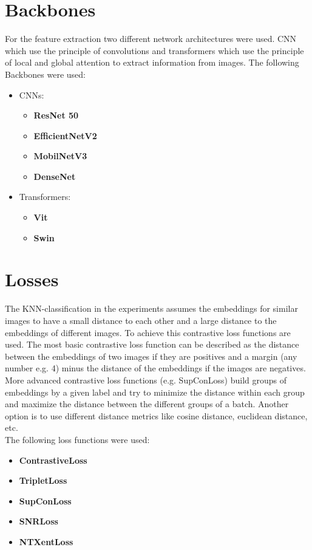 \documentclass[12pt,a4paper]{report}
\begin{document}
\section{Backbones}
For the feature extraction two different network architectures were used.
CNN which use the principle of convolutions and transformers which use the principle of local and global attention to extract information from images. 
The following Backbones were used:
\begin{itemize}
	\item CNNs:\begin{itemize}
		\item \textbf{ResNet 50} \cite{resnet}
		\item \textbf{EfficientNetV2} \cite{EfficientNetV2}
		\item \textbf{MobilNetV3} \cite{MobilNetV3}
		\item \textbf{DenseNet} \cite{DenseNet}
	\end{itemize}
	\item Transformers:\begin{itemize}
		\item \textbf{Vit} \cite{ViT}
		\item \textbf{Swin} \cite{liu2021swin}
    \end{itemize}
\end{itemize}

\section{Losses}
The KNN-classification in the experiments assumes the embeddings for similar images to have a small distance to each other
and a large distance to the embeddings of different images.
To achieve this contrastive loss functions are used.
The most basic contrastive loss function can be described as the distance between the embeddings of two images if they are positives and a margin (any number e.g. 4) minus the distance of the embeddings if the images are negatives.
More advanced contrastive loss functions (e.g. SupConLoss) build groups of embeddings by a given label and try to minimize the distance within each group and maximize the distance between the different groups of a batch.
Another option is to use different distance metrics like cosine distance, euclidean distance, etc.
\\
The following loss functions were used:
\begin{itemize}
	\item \textbf{ContrastiveLoss} \cite{ContrastiveLoss}
 	\item \textbf{TripletLoss} \cite{TripletLoss}
  	\item \textbf{SupConLoss} \cite{SupConLoss}
    \item \textbf{SNRLoss} \cite{SNRLoss}
    \item \textbf{NTXentLoss} \cite{simclr}
\end{itemize}
\end{document}
